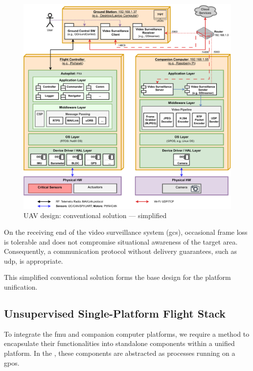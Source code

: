 \begin{figure}[!hbt]
  \centering
  \includegraphics[width=1.0\textwidth]{./img/pdf/uav-main-design-conv-sol-2.pdf} 
%   
  \caption{UAV design: conventional solution --- simplified}%
  \label{fig:uav-design-conv-sol-2}
\end{figure}

On the receiving end of the video surveillance system (\gls{gcs}), occasional frame loss is tolerable and does not compromise situational awareness of the target area. Consequently, a communication protocol without delivery guarantees, such as \gls{udp}, is appropriate.

This simplified conventional solution forms the base design for the platform
unification.

\subsection{Unsupervised Single-Platform Flight Stack}
\label{sec:unsuperv-stack}
To integrate the \gls{fmu} and companion computer platforms, we require a method to encapsulate their functionalities into standalone components within a unified platform. In the , these components are abstracted as processes running on a \gls{gpos}.


